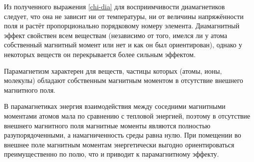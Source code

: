 %
%
%


Из полученного выражения \eqref{chi-dia} для восприимчивости диамагнетиков
следует, что она не зависит ни от температуры, ни от величины напряжённости поля
и растёт пропорционально порядковому номеру элемента.
Диамагнитный эффект свойствен всем веществам (независимо от того, имелся ли у
атома собственный магнитный момент или нет и как он был ориентирован), однако у
некоторых веществ он перекрывается более сильным 
эффектом.



Парамагнетизм характерен для веществ, частицы которых (атомы, ионы, молекулы)
обладают собственным магнитным моментом в отсутствие внешнего магнитного поля.

В парамагнетиках энергия взаимодействия между соседними магнитными моментами
атомов мала по сравнению с тепловой энергией,
поэтому в отсутствие внешнего магнитного поля магнитные моменты
являются полностью разупорядоченными, а намагниченность среды равна нулю.
При помещении во внешнее поле магнитным моментам энергетически выгодно
ориентироваться преимущественно по полю, что и приводит к парамагнитному эффекту.

